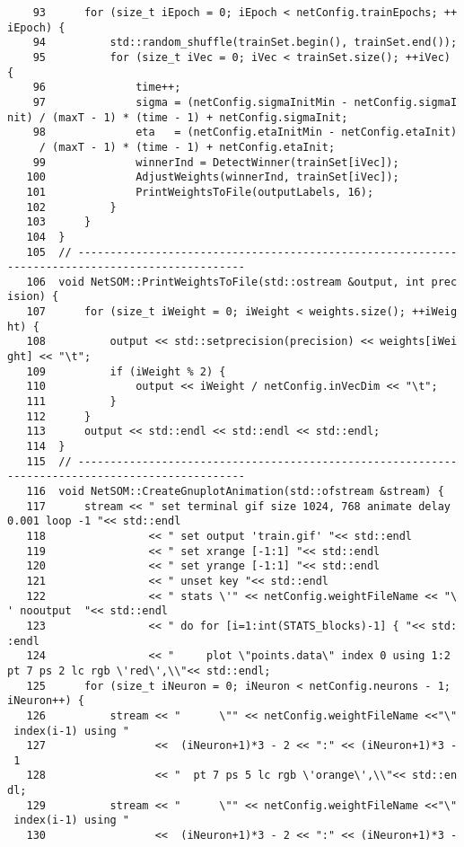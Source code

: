 \begin{verbatim}
    93      for (size_t iEpoch = 0; iEpoch < netConfig.trainEpochs; ++
iEpoch) {
    94          std::random_shuffle(trainSet.begin(), trainSet.end());
    95          for (size_t iVec = 0; iVec < trainSet.size(); ++iVec) 
{
    96              time++;
    97              sigma = (netConfig.sigmaInitMin - netConfig.sigmaI
nit) / (maxT - 1) * (time - 1) + netConfig.sigmaInit;
    98              eta   = (netConfig.etaInitMin - netConfig.etaInit)
     / (maxT - 1) * (time - 1) + netConfig.etaInit;
    99              winnerInd = DetectWinner(trainSet[iVec]);
   100              AdjustWeights(winnerInd, trainSet[iVec]);
   101              PrintWeightsToFile(outputLabels, 16);
   102          }
   103      }
   104  }
   105  // -----------------------------------------------------------
-------------------------------------
   106  void NetSOM::PrintWeightsToFile(std::ostream &output, int prec
ision) {
   107      for (size_t iWeight = 0; iWeight < weights.size(); ++iWeig
ht) {
   108          output << std::setprecision(precision) << weights[iWei
ght] << "\t";
   109          if (iWeight % 2) {
   110              output << iWeight / netConfig.inVecDim << "\t";
   111          }
   112      }
   113      output << std::endl << std::endl << std::endl;
   114  }
   115  // -----------------------------------------------------------
-------------------------------------
   116  void NetSOM::CreateGnuplotAnimation(std::ofstream &stream) {
   117      stream << " set terminal gif size 1024, 768 animate delay 
0.001 loop -1 "<< std::endl
   118                << " set output 'train.gif' "<< std::endl
   119                << " set xrange [-1:1] "<< std::endl
   120                << " set yrange [-1:1] "<< std::endl
   121                << " unset key "<< std::endl              
   122                << " stats \'" << netConfig.weightFileName << "\
' nooutput  "<< std::endl
   123                << " do for [i=1:int(STATS_blocks)-1] { "<< std:
:endl
   124                << "     plot \"points.data\" index 0 using 1:2 
pt 7 ps 2 lc rgb \'red\',\\"<< std::endl;
   125      for (size_t iNeuron = 0; iNeuron < netConfig.neurons - 1; 
iNeuron++) {
   126          stream << "      \"" << netConfig.weightFileName <<"\"
 index(i-1) using " 
   127                 <<  (iNeuron+1)*3 - 2 << ":" << (iNeuron+1)*3 -
 1
   128                 << "  pt 7 ps 5 lc rgb \'orange\',\\"<< std::en
dl;
   129          stream << "      \"" << netConfig.weightFileName <<"\"
 index(i-1) using " 
   130                 <<  (iNeuron+1)*3 - 2 << ":" << (iNeuron+1)*3 -

\end{verbatim}
